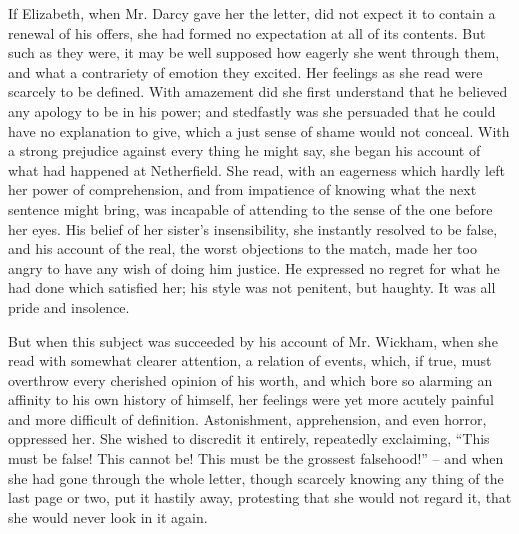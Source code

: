 If Elizabeth, when Mr. Darcy gave her the letter, did
not expect it to contain a renewal of his offers, she had
formed no expectation at all of its contents. But such
as they were, it may be well supposed how eagerly she
went through them, and what a contrariety of emotion
they excited. Her feelings as she read were scarcely to
be defined. With amazement did she first understand
that he believed any apology to be in his power; and
stedfastly was she persuaded that he could have no
explanation to give, which a just sense of shame would
not conceal. With a strong prejudice against every thing
he might say, she began his account of what had happened
at Netherfield. She read, with an eagerness which hardly
left her power of comprehension, and from impatience of
knowing what the next sentence might bring, was incapable
of attending to the sense of the one before her eyes. His
belief of her sister’s insensibility, she instantly resolved
to be false, and his account of the real, the worst objections
to the match, made her too angry to have any wish of
doing him justice. He expressed no regret for what he
had done which satisfied her; his style was not penitent,
but haughty. It was all pride and insolence.

But when this subject was succeeded by his account
of Mr. Wickham, when she read with somewhat clearer
attention, a relation of events, which, if true, must overthrow
every cherished opinion of his worth, and which
bore so alarming an affinity to his own history of himself,
her feelings were yet more acutely painful and more
difficult of definition. Astonishment, apprehension, and
even horror, oppressed her. She wished to discredit it
entirely, repeatedly exclaiming, “This must be false!
This cannot be! This must be the grossest falsehood!” -- and
when she had gone through the whole letter, though
scarcely knowing any thing of the last page or two, put
it hastily away, protesting that she would not regard it,
that she would never look in it again.

